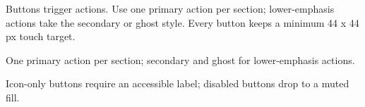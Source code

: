 
Buttons trigger actions. Use one primary action per section; lower-emphasis actions take the
secondary or ghost style. Every button keeps a minimum 44 x 44 px touch target.

\quad{}\quad{}\quad{}\quad{}\quad{}\par
\vspace{2mm}
{\small\color{muted}One primary action per section; secondary and ghost for lower-emphasis actions.}\par

\quad{}\quad{}\par

\quad{}\quad{}\par
\vspace{2mm}
{\small\color{muted}Icon-only buttons require an accessible label; disabled buttons drop to a muted fill.}\par

\clearpage
